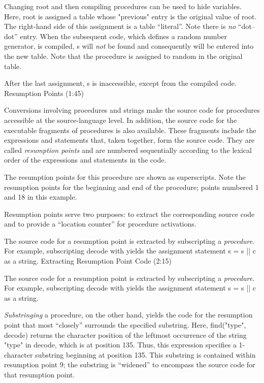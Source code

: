Changing {\pt root} and then compiling procedures can be used to
hide variables.
Here, {\pt root} is assigned a table whose {\pt "previous"}
entry is the original value of {\pt root}.
The right-hand side of this assignment is a table ``literal''.
Note there is {\sl no\/} ``dot--dot'' entry.
When the subsequent code, which defines a random number generator,
is compiled, {\pt s \rm will \sl not\/} be found and consequently will
be entered into the new table.
Note that the procedure is assigned to {\pt random} in the original table.

After the last assignment, {\pt s} is inaccessible, except
from the compiled code.
\NewPage
\beginsection Resumption Points (1:45)

Conversions involving procedures and strings make
the source code for procedures accessible at the source-language level.
In addition, the source code for the
executable fragments of procedures is also available.
These fragments include the expressions and statements that, taken together,
form the source code.
They are called {\sl resumption points} and are numbered sequentially
according to the lexical order of the expressions and statements in the code.

The resumption points for this procedure are shown as superscripts.
Note the resumption points for the beginning and end of the procedure;
points numbered 1 and 18 in this example.

Resumption points serve two purposes: to extract the corresponding
source code and to provide a ``location counter'' for procedure activations.

\POPL The source code for a resumption point is extracted by
subscripting a {\sl procedure}.
For example, subscripting {\pt decode \rm with }
yields the assignment statement {\pt s = s || c} as a string.
\NewPage\Longtrue
\beginsection Extracting Resumption Point Code (2:15)

The source code for a resumption point is extracted by
subscripting a {\sl procedure}.
For example, subscripting {\pt decode \rm with }
yields the assignment statement {\pt s = s || c} as a string.

{\sl Substringing\/} a procedure, on the other hand,
yields the code for the resumption point that most
``closely'' surrounds the specified substring.
Here, {\pt find("type", decode)} returns the character
position of the leftmost occurrence of the
string {\pt "type" \rm in \pt decode}, which is at position 135.
Thus, this expression specifies a 1-character substring beginning
at position 135.
This substring is contained within resumption point 9;
the substring is ``widened'' to encompass the source code
for that resumption point.


